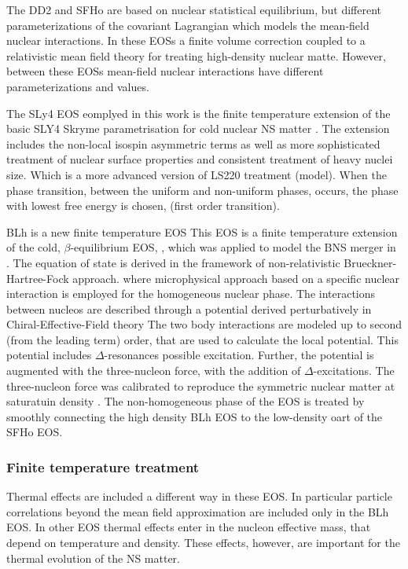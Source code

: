 \documentclass[11pt,a4paper,headinclude=true,DIV=14,BCOR=8mm,chapterprefix,listof=totoc,twoside,openright,abstracton]{scrbook}
\begin{document}
The DD2 and SFHo are based on nuclear statistical equilibrium, but 
different parameterizations of the covariant Lagrangian which models the mean-field nuclear interactions.
In these EOSs a finite volume correction coupled to a relativistic mean field theory for treating high-density nuclear matte. However, between these EOSs mean-field nuclear interactions have different parameterizations and values.

The SLy4 EOS eomplyed in this work is the finite temperature extension \cite{daSilvaSchneider:2017jpg}
of the basic SLY4 Skryme parametrisation for cold nuclear NS matter \cite{Douchin:2001sv}.
The extension includes the non-local isospin asymmetric terms as well as more sophisticated 
treatment of nuclear surface properties and consistent treatment of heavy nuclei size. 
Which is a more advanced version of LS220 treatment (model).
When the phase transition, between the uniform and non-uniform phases, occurs, the phase with lowest 
free energy is chosen, (first order transition).

BLh is a new finite temperature EOS \cite{Logoteta:2020yxf}
This EOS is a finite temperature extension of the cold, $\beta$-equilibrium EOS, \cite{Bombaci:2018ksa},
which was applied to model the BNS merger in \cite{Endrizzi:2018uwl}.
The equation of state is derived in the framework of non-relativistic Brueckner-Hartree-Fock approach.
where microphysical approach based on a specific nuclear interaction is employed for the homogeneous nuclear phase.
The interactions between nucleos are described through a potential derived perturbatively 
in Chiral-Effective-Field theory \cite{Machleidt:2011zz}
The two body interactions are modeled up to second (from the leading term) order, that are used to calculate the local potential. This potential includes $\Delta$-resonances possible excitation. 
Further, the potential is augmented with the three-nucleon force, with the addition of $\Delta$-excitations.
The three-nucleon force was calibrated to reproduce the symmetric nuclear matter at saturatuin density \cite{Logoteta:2016nzc}.
The non-homogeneous phase of the EOS is treated by smoothly connecting the high density BLh EOS to the low-density oart of the SFHo EOS.


\subsubsection{Finite temperature treatment}


Thermal effects are included a different way in these EOS. 
In particular particle correlations beyond the mean field approximation are included only in the BLh EOS.
In other EOS thermal effects enter in the nucleon effective mass, that depend on temperature and density.
These effects, however, are important for the thermal evolution of the NS matter.
\end{document}
